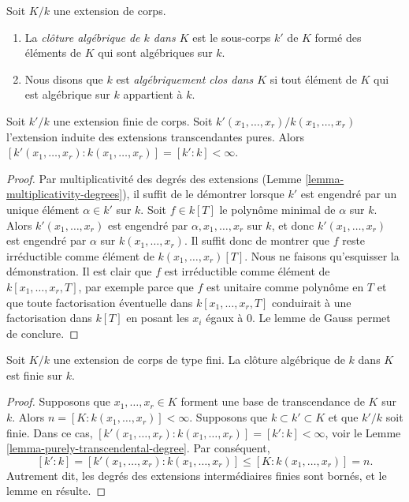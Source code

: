 \begin{definition}
\label{definition-algebraically-closed-in}
Soit $K/k$ une extension de corps.
\begin{enumerate}
\item La {\it clôture algébrique de $k$ dans $K$} est le sous-corps
$k'$ de $K$ formé des éléments de $K$ qui sont algébriques sur $k$.
\item Nous disons que $k$ est {\it algébriquement clos dans $K$} si
tout élément de $K$ qui est algébrique sur $k$
appartient à $k$.
\end{enumerate}
\end{definition}

\begin{lemma}
\label{lemma-purely-transcendental-degree}
Soit $k'/k$ une extension finie de corps. Soit
$k'(x_1, \ldots, x_r)/k(x_1, \ldots, x_r)$
l'extension induite des extensions transcendantes pures.
Alors $[k'(x_1, \ldots, x_r) : k(x_1, \ldots, x_r)] = [k' : k] < \infty$.
\end{lemma}

\begin{proof}
Par multiplicativité des degrés des extensions
(Lemme \ref{lemma-multiplicativity-degrees}),
il suffit de le démontrer lorsque $k'$ est engendré par un unique élément
$\alpha \in k'$ sur $k$. Soit $f \in k[T]$ le polynôme minimal
de $\alpha$ sur $k$. Alors $k'(x_1, \ldots, x_r)$ est engendré
par $\alpha, x_1, \ldots, x_r$ sur $k$, et donc $k'(x_1, \ldots, x_r)$
est engendré par $\alpha$ sur $k(x_1, \ldots, x_r)$.
Il suffit donc de montrer que $f$ reste irréductible comme
élément de $k(x_1, \ldots, x_r)[T]$. Nous ne faisons qu'esquisser la démonstration.
Il est clair que $f$ est irréductible comme élément de
$k[x_1, \ldots, x_r, T]$, par exemple parce que $f$ est unitaire
comme polynôme en $T$ et que toute factorisation éventuelle dans
$k[x_1, \ldots, x_r, T]$ conduirait à une factorisation dans $k[T]$
en posant les $x_i$ égaux à $0$. Le lemme de Gauss permet de conclure.
\end{proof}

\begin{lemma}
\label{lemma-algebraic-closure-in-finitely-generated}
Soit $K/k$ une extension de corps de type fini.
La clôture algébrique de $k$ dans $K$ est finie sur $k$.
\end{lemma}

\begin{proof}
Supposons que $x_1, \ldots, x_r \in K$ forment une base de transcendance de $K$
sur $k$. Alors $n = [K : k(x_1, \ldots, x_r)] < \infty$.
Supposons que $k \subset k' \subset K$ et que $k'/k$ soit finie.
Dans ce cas,
$[k'(x_1, \ldots, x_r) : k(x_1, \ldots, x_r)] = [k' : k] < \infty$, voir le
Lemme \ref{lemma-purely-transcendental-degree}.
Par conséquent,
$$
[k' : k] = [k'(x_1, \ldots, x_r) : k(x_1, \ldots, x_r)] \leq
[K : k(x_1, \ldots, x_r)] = n.
$$
Autrement dit, les degrés des extensions intermédiaires finies sont bornés,
et le lemme en résulte.
\end{proof}






